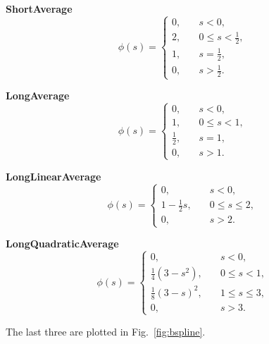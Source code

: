 \documentclass[11pt]{article}
\begin{document}
\begin{description}
\item \textbf{ShortAverage}
\begin{equation}
\phi(s) = \begin{cases}
	0, & \quad s < 0,	\\
	2, & \quad 0 \leq s < \frac{1}{2},\\
	1, & \quad s = \frac{1}{2}, \\
	0, & \quad s > \frac{1}{2}.
	\end{cases}
\label{eq:bspline00}
\end{equation}

\item \textbf{LongAverage}
\begin{equation}
\phi(s) = \begin{cases}
	0, & \quad s < 0,	\\
	1, & \quad 0 \leq s < 1, \\
	\frac{1}{2},& \quad s = 1,\\
	0, & \quad s > 1.
	\end{cases}
\label{eq:bspline0}
\end{equation}

\item \textbf{LongLinearAverage}
\begin{equation}
\phi(s) = \begin{cases}
	0, & \quad s < 0,	\\
	1 - \frac{1}{2} s, & \quad 0\leq s\leq2,\\
	0, & \quad s > 2.
	\end{cases}
\label{eq:bspline1}
\end{equation}

\item \textbf{LongQuadraticAverage}
\begin{equation}
\phi(s) = \begin{cases}
	0, & \quad s < 0,	\\
	\frac{1}{4}(3-s^{2}), & \quad 0 \leq s < 1,\\
	\frac{1}{8}(3-s)^{2}, & \quad 1 \leq s \leq 3,\\
	0, & \quad s > 3.
	\end{cases}
\label{eq:bspline2}
\end{equation}
\end{description}
The last three are plotted in Fig.~\ref{fig:bspline}.
\end{document}
